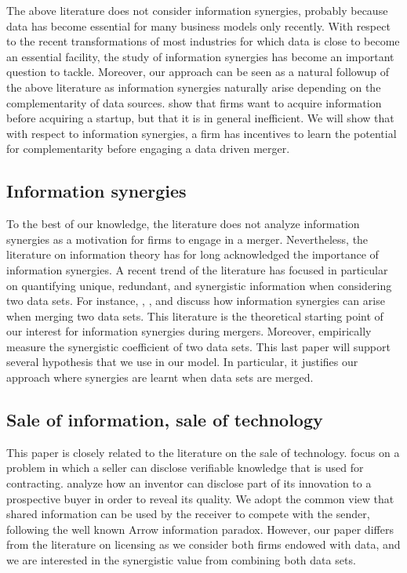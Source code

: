 \documentclass[a4paper,leqno]{article}%
\begin{document}
The above literature does not consider information synergies, probably because data has become essential for many business models only recently. With respect to the recent transformations of most industries for which data is close to become an essential facility, the study of information synergies has become an important question to tackle. Moreover, our approach can be seen as a natural followup of the above literature as information synergies naturally arise depending on the complementarity of data sources. \cite{daley2020bargaining} show that firms want to acquire information before acquiring a startup, but that it is in general inefficient. We will show that with respect to information synergies, a firm has incentives to learn the potential for complementarity before engaging a data driven merger.

\subsection{Information synergies}

To the best of our knowledge, the literature does not analyze information synergies as a motivation for firms to engage in a merger. Nevertheless, the literature on information theory has for long acknowledged the importance of information synergies. A recent trend of the literature has focused in particular on quantifying unique, redundant, and synergistic information when considering two data sets. For instance, \cite{bertschinger2014quantifying}, \cite{Griffith2014}, and \cite{olbrich2015information} discuss how information synergies can arise when merging two data sets. This literature is the theoretical starting point of our interest for information synergies during mergers. Moreover, \cite{sootla2017analyzing} empirically measure the synergistic coefficient of two data sets. This last paper will support several hypothesis that we use in our model. In particular, it justifies our approach where synergies are learnt when data sets are merged. 


\subsection{Sale of information, sale of technology}

\medskip

This paper is closely related to the literature on the sale of technology. \cite{d2000bargaining} focus on a problem in which a seller can disclose verifiable knowledge that is used for contracting. \cite{anton2002sale} analyze how an inventor can disclose part of its innovation to a prospective buyer in order to reveal its quality. We adopt the common view that shared information can be used by the receiver to compete with the sender, following the well known Arrow information paradox. However, our paper differs from the literature on licensing as we consider both firms endowed with data, and we are interested in the synergistic value from combining both data sets. 
\end{document}

